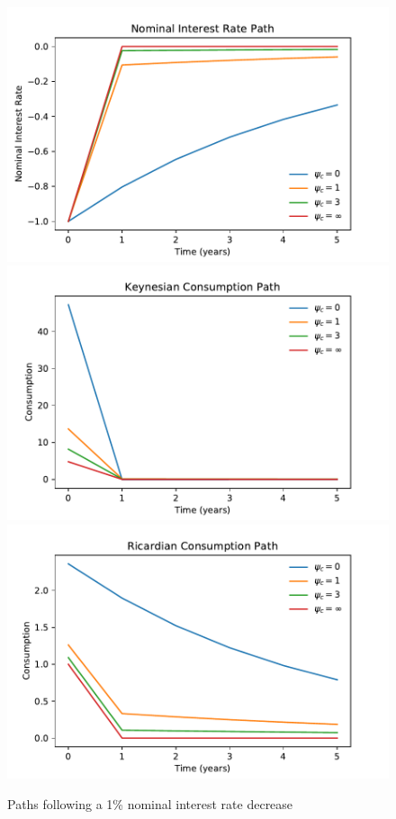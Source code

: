 \documentclass[titlepage]{\econtex}\newcommand{\texname}{ConsumptionHeterogeneity}
\begin{document}
\begin{figure} 
	\begin{centering}
		\includegraphics[scale=0.5]{../Python/DoloCode/Figures/TANK_capital_IRF_i.pdf}
		\includegraphics[scale=0.5]{../Python/DoloCode/Figures/TANK_capital_IRF_c_K.pdf}
		\includegraphics[scale=0.5]{../Python/DoloCode/Figures/TANK_capital_IRF_c_R.pdf}
		\caption{Paths following a 1\% nominal interest rate decrease}
		\label{fig:iandcpath}
	\end{centering}
\end{figure}
\end{document}
